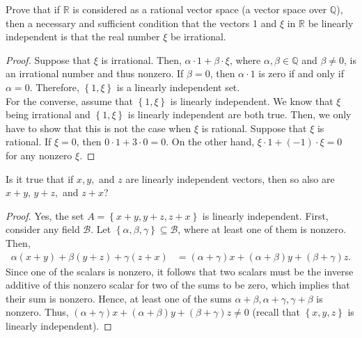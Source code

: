 \documentclass[12pt]{article}
\newcommand{\R}{\mathbb{R}}
\newcommand{\Q}{\mathbb{Q}}
\newenvironment{problem}[2][Problem]{\begin{trivlist} \item[\hskip \labelsep {\bfseries #1}\hskip \labelsep {\bfseries #2.}]}{\end{trivlist}}
\begin{document}
\begin{problem}{2}
  Prove that if $\R$ is considered as a rational vector space (a vector space over $\Q$), then a necessary and sufficient condition that the vectors 1 and  $\xi$ in $\R$ be linearly independent is that the real number $\xi$ be irrational.
\begin{proof}
  Suppose that $\xi$ is irrational. Then, $\alpha\cdot 1 + \beta\cdot \xi$, where $\alpha,\beta\in \Q$ and $\beta \neq 0$, is an irrational number and thus nonzero. If $\beta = 0$, then $\alpha\cdot 1$ is zero if and only if $\alpha = 0$. Therefore, $\left\{ 1,\xi \right\}$ is a linearly independent set.\\
  For the converse, assume that $\left\{ 1,\xi \right\}$ is linearly independent. We know that $\xi$ being irrational and $\left\{ 1,\xi \right\}$ is linearly independent are both true. Then, we only have to show that this is not the case when $\xi$ is rational. Suppose that $\xi$ is rational. If $\xi = 0$, then $0\cdot 1 + 3\cdot 0 = 0$. On the other hand, $\xi\cdot 1 + (-1)\cdot \xi = 0$ for any nonzero $\xi$.
\end{proof}
\end{problem}
\begin{problem}{3}
  Is it true that if $x, y,$ and $z$ are linearly independent vectors, then so also are $x+y$, $y+z,$ and $z+x$?
\begin{proof}
  Yes, the set $A=\left\{ x+y,y+z,z+x \right\}$ is linearly independent. First, consider any field $\mathcal{B}$. Let $\left\{ \alpha,\beta,\gamma \right\}\subseteq \mathcal{B}$, where at least one of them is nonzero. Then,
\begin{align*}
  \alpha (x+y) + \beta (y+z) + \gamma (z+x) &= (\alpha+\gamma)x + (\alpha+\beta)y + (\beta+\gamma)z.
\end{align*}
Since one of the scalars is nonzero, it follows that two scalars must be the inverse additive of this nonzero scalar for two of the sums to be zero, which implies that their sum is nonzero. Hence, at least one of the sums $\alpha+\beta, \alpha+\gamma,\gamma + \beta$ is nonzero. Thus,  $(\alpha+\gamma)x + (\alpha + \beta) y + (\beta+\gamma)z \neq 0$ (recall that $\left\{ x,y,z \right\}$ is linearly independent).
\end{proof}
\end{problem}
\end{document}

